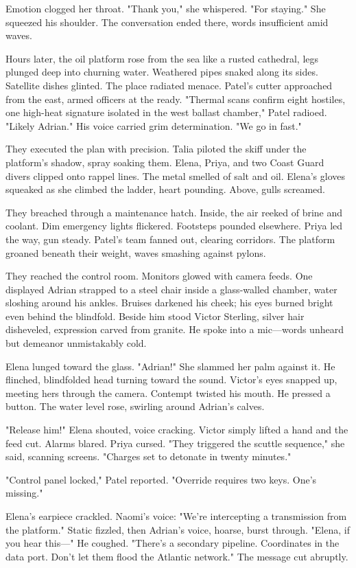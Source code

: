 Emotion clogged her throat. "Thank you," she whispered. "For staying." She squeezed his shoulder. The conversation ended there, words insufficient amid waves.

Hours later, the oil platform rose from the sea like a rusted cathedral, legs plunged deep into churning water. Weathered pipes snaked along its sides. Satellite dishes glinted. The place radiated menace. Patel's cutter approached from the east, armed officers at the ready. "Thermal scans confirm eight hostiles, one high-heat signature isolated in the west ballast chamber," Patel radioed. "Likely Adrian." His voice carried grim determination. "We go in fast."

They executed the plan with precision. Talia piloted the skiff under the platform's shadow, spray soaking them. Elena, Priya, and two Coast Guard divers clipped onto rappel lines. The metal smelled of salt and oil. Elena's gloves squeaked as she climbed the ladder, heart pounding. Above, gulls screamed.

They breached through a maintenance hatch. Inside, the air reeked of brine and coolant. Dim emergency lights flickered. Footsteps pounded elsewhere. Priya led the way, gun steady. Patel's team fanned out, clearing corridors. The platform groaned beneath their weight, waves smashing against pylons.

They reached the control room. Monitors glowed with camera feeds. One displayed Adrian strapped to a steel chair inside a glass-walled chamber, water sloshing around his ankles. Bruises darkened his cheek; his eyes burned bright even behind the blindfold. Beside him stood Victor Sterling, silver hair disheveled, expression carved from granite. He spoke into a mic—words unheard but demeanor unmistakably cold.

Elena lunged toward the glass. "Adrian!" She slammed her palm against it. He flinched, blindfolded head turning toward the sound. Victor's eyes snapped up, meeting hers through the camera. Contempt twisted his mouth. He pressed a button. The water level rose, swirling around Adrian's calves.

"Release him!" Elena shouted, voice cracking. Victor simply lifted a hand and the feed cut. Alarms blared. Priya cursed. "They triggered the scuttle sequence," she said, scanning screens. "Charges set to detonate in twenty minutes."

"Control panel locked," Patel reported. "Override requires two keys. One's missing."

Elena's earpiece crackled. Naomi's voice: "We're intercepting a transmission from the platform." Static fizzled, then Adrian's voice, hoarse, burst through. "Elena, if you hear this—" He coughed. "There's a secondary pipeline. Coordinates in the data port. Don't let them flood the Atlantic network." The message cut abruptly.

